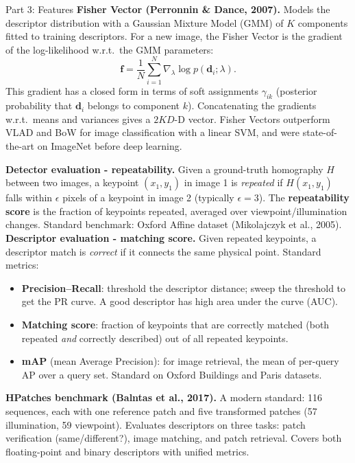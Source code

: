 \documentclass[letterpaper]{article}
\begin{document}
\begin{notes}{Part 3: Features}
\textbf{Fisher Vector (Perronnin \& Dance, 2007).} Models the descriptor distribution with a Gaussian Mixture Model (GMM) of $K$ components fitted to training descriptors. For a new image, the Fisher Vector is the gradient of the log-likelihood w.r.t.\ the GMM parameters:
$$\mathbf{f} = \frac{1}{N}\sum_{i=1}^{N} \nabla_\lambda \log p(\mathbf{d}_i; \lambda).$$
This gradient has a closed form in terms of soft assignments $\gamma_{ik}$ (posterior probability that $\mathbf{d}_i$ belongs to component $k$). Concatenating the gradients w.r.t.\ means and variances gives a $2KD$-D vector. Fisher Vectors outperform VLAD and BoW for image classification with a linear SVM, and were state-of-the-art on ImageNet before deep learning.


\textbf{Detector evaluation - repeatability.} Given a ground-truth homography $H$ between two images, a keypoint $(x_1, y_1)$ in image 1 is \emph{repeated} if $H(x_1,y_1)$ falls within $\epsilon$ pixels of a keypoint in image 2 (typically $\epsilon=3$). The \textbf{repeatability score} is the fraction of keypoints repeated, averaged over viewpoint/illumination changes. Standard benchmark: Oxford Affine dataset (Mikolajczyk et al., 2005).\\

\textbf{Descriptor evaluation - matching score.} Given repeated keypoints, a descriptor match is \emph{correct} if it connects the same physical point. Standard metrics:
\begin{itemize}
    \item \textbf{Precision--Recall}: threshold the descriptor distance; sweep the threshold to get the PR curve. A good descriptor has high area under the curve (AUC).
    \item \textbf{Matching score}: fraction of keypoints that are correctly matched (both repeated \emph{and} correctly described) out of all repeated keypoints.
    \item \textbf{mAP} (mean Average Precision): for image retrieval, the mean of per-query AP over a query set. Standard on Oxford Buildings and Paris datasets.
\end{itemize}

\textbf{HPatches benchmark (Balntas et al., 2017).} A modern standard: 116 sequences, each with one reference patch and five transformed patches (57 illumination, 59 viewpoint). Evaluates descriptors on three tasks: patch verification (same/different?), image matching, and patch retrieval. Covers both floating-point and binary descriptors with unified metrics.


\end{notes}
\end{document}

